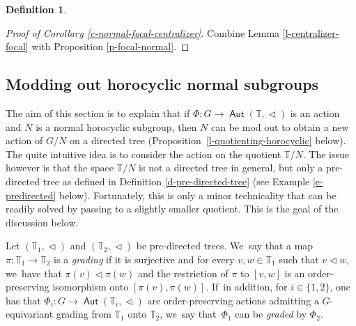 \documentclass[JEP,XML,SOM,Unicode,NoFloatCountersInSection,published]{cedram}
\theoremstyle{definition}
\newtheorem{dfn}[thm]{Definition}
\DeclareMathOperator{\Aut}{\mathsf{Aut}}
\newcommand{\Tbb}{\mathbb T}
\newcommand{\treeorder}{\mathrel{\triangleleft}}
\begin{document}
\begin{dfn}
\begin{proof}[Proof of Corollary \ref{c-normal-focal-centralizer}]
Combine Lemma \ref{l-centralizer-focal} with Proposition \ref{p-focal-normal}.
\end{proof}

\subsection{Modding out horocyclic normal subgroups}
\label{s-modding-out}
The aim of this section is to explain that if $\Phi\colon G\to \Aut(\Tbb, \treeorder)$ is an action and $N$ is a normal horocyclic subgroup, then $N$ can be mod out to obtain a new action of $G/N$ on a directed tree (Proposition~\ref{l-quotienting-horocyclic} below). The quite intuitive idea is to consider the action on the quotient $\Tbb/N$. The issue however is that the space $\Tbb/N$ is not a directed tree in general, but only a pre-directed tree as defined in Definition \ref{d-pre-directed-tree} (see Example \ref{e-predirected} below).
Fortunately, this is only a minor technicality that can be readily solved by passing to a slightly smaller quotient. This is the goal of the discussion below.

Let $(\Tbb_1,\treeorder)$ and $(\Tbb_2,\treeorder)$ be pre-directed trees. We~say that a map $\pi\colon \Tbb_1\to\Tbb_2$ is a \emph{grading} if it is surjective and for every $v, w\in \Tbb_1$ such that $v\treeorder w$, we~have that $\pi(v)\treeorder \pi(w)$ and the restriction of $\pi$ to $[v, w]$ is an order-preserving isomorphism onto $[\pi(v), \pi(w)]$. If~in addition, for $i\in \{1,2\}$, one has that $\Phi_i\colon G\to \Aut(\Tbb_i, \treeorder)$ are order-preserving actions admitting a $G$-equivariant grading from $\Tbb_1$ onto $\Tbb_2$, we~say that~$\Phi_1$ can be \emph{graded} by $\Phi_2$.
\end{dfn}
\end{document}
